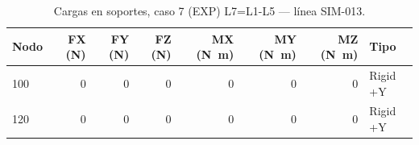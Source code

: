 \begin{table}[htbp]
  \centering
  \footnotesize
  \caption{Cargas en soportes, caso 7 (EXP) L7=L1-L5 — línea SIM-013.}
  \label{tab:restricciones-exp}
  \begin{tabular}{lrrrrrrl}
    \toprule
    Nodo & FX (\si{N}) & FY (\si{N}) & FZ (\si{N}) & MX (\si{N.m}) & MY (\si{N.m}) & MZ (\si{N.m}) & Tipo \\
    \midrule
    100 & \num{0} & \num{0} & \num{0} & \num{0} & \num{0} & \num{0} & Rigid +Y \\
    120 & \num{0} & \num{0} & \num{0} & \num{0} & \num{0} & \num{0} & Rigid +Y \\
    \bottomrule
  \end{tabular}
\end{table}
